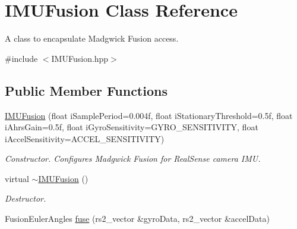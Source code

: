 \hypertarget{classIMUFusion}{}\section{I\+M\+U\+Fusion Class Reference}
\label{classIMUFusion}


A class to encapsulate Madgwick Fusion access.  




{\ttfamily \#include $<$I\+M\+U\+Fusion.\+hpp$>$}

\subsection*{Public Member Functions}
\begin{DoxyCompactItemize}
\item 
\mbox{\label{classIMUFusion_ab4624c7f974e2e9328b62a6b945dbeb4}} 
\hyperlink{classIMUFusion_ab4624c7f974e2e9328b62a6b945dbeb4}{I\+M\+U\+Fusion} (float i\+Sample\+Period=0.\+004f, float i\+Stationary\+Threshold=0.\+5f, float i\+Ahrs\+Gain=0.\+5f, float i\+Gyro\+Sensitivity=\+G\+Y\+R\+O\+\_\+\+S\+E\+N\+S\+I\+T\+I\+V\+I\+T\+Y, float i\+Accel\+Sensitivity=\+A\+C\+C\+E\+L\+\_\+\+S\+E\+N\+S\+I\+T\+I\+V\+I\+T\+Y)
\begin{DoxyCompactList}\small\item\em Constructor. Configures Madgwick Fusion for Real\+Sense camera I\+MU. \end{DoxyCompactList}\item 
\mbox{\label{classIMUFusion_adee08e1eb18efbe29208619cf3aba857}} 
virtual \hyperlink{classIMUFusion_adee08e1eb18efbe29208619cf3aba857}{$\sim$\+I\+M\+U\+Fusion} ()
\begin{DoxyCompactList}\small\item\em Destructor. \end{DoxyCompactList}\item 
Fusion\+Euler\+Angles \hyperlink{classIMUFusion_a47060c975f3a11d03dca5de9de1e8098}{fuse} (rs2\+\_\+vector \&gyro\+Data, rs2\+\_\+vector \&accel\+Data)
\end{DoxyCompactItemize}
